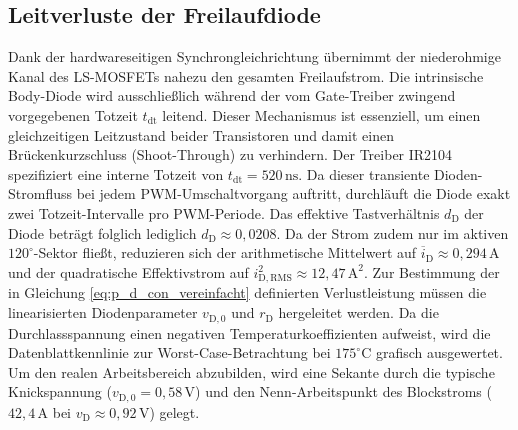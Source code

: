 \subsection{Leitverluste der Freilaufdiode}
\label{subsec:leitverluste_diode}

Dank der hardwareseitigen Synchrongleichrichtung übernimmt der niederohmige Kanal des LS-MOSFETs nahezu den gesamten Freilaufstrom. Die intrinsische Body-Diode wird ausschließlich während der vom Gate-Treiber zwingend vorgegebenen Totzeit $t_{\mathrm{dt}}$ leitend. Dieser Mechanismus ist essenziell, um einen gleichzeitigen Leitzustand beider Transistoren und damit einen Brückenkurzschluss (Shoot-Through) zu verhindern.
Der Treiber IR2104 spezifiziert eine interne Totzeit von $t_{\mathrm{dt}} = 520\,\mathrm{ns}$. Da dieser transiente Dioden-Stromfluss bei jedem PWM-Umschaltvorgang auftritt, durchläuft die Diode exakt zwei Totzeit-Intervalle pro PWM-Periode. Das effektive Tastverhältnis $d_{\mathrm{D}}$ der Diode beträgt folglich lediglich $d_{\mathrm{D}} \approx 0{,}0208$. Da der Strom zudem nur im aktiven $120^\circ$-Sektor fließt, reduzieren sich der arithmetische Mittelwert auf $\overline{i}_{\mathrm{D}} \approx 0{,}294\,\mathrm{A}$ und der quadratische Effektivstrom auf $i_{\mathrm{D,RMS}}^2 \approx 12{,}47\,\mathrm{A}^2$.
Zur Bestimmung der in Gleichung \ref{eq:p_d_con_vereinfacht} definierten Verlustleistung müssen die linearisierten Diodenparameter $v_{\mathrm{D,0}}$ und $r_\mathrm{D}$ hergeleitet werden. Da die Durchlassspannung einen negativen Temperaturkoeffizienten aufweist, wird die Datenblattkennlinie zur Worst-Case-Betrachtung bei $175^\circ\mathrm{C}$ grafisch ausgewertet. Um den realen Arbeitsbereich abzubilden, wird eine Sekante durch die typische Knickspannung ($v_{\mathrm{D,0}} = 0{,}58\,\mathrm{V}$) und den Nenn-Arbeitspunkt des Blockstroms ($42{,}4\,\mathrm{A}$ bei $v_{\mathrm{D}} \approx 0{,}92\,\mathrm{V}$) gelegt.
